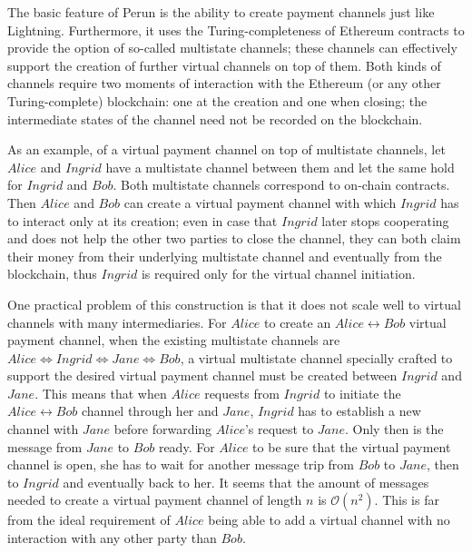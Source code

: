 The basic feature of Perun is the ability to create payment channels just like
Lightning. Furthermore, it uses the Turing-completeness of Ethereum contracts to provide
the option of so-called multistate channels; these channels can effectively support the
creation of further virtual channels on top of them. Both kinds of channels require two
moments of interaction with the Ethereum (or any other Turing-complete) blockchain: one
at the creation and one when closing; the intermediate states of the channel need not be
recorded on the blockchain.

As an example, of a virtual payment channel on top of multistate channels, let $Alice$
and $Ingrid$ have a multistate channel between them and let the same hold for $Ingrid$
and $Bob$. Both multistate channels correspond to on-chain contracts. Then $Alice$ and
$Bob$ can create a virtual payment channel with which $Ingrid$ has to interact only at
its creation; even in case that $Ingrid$ later stops cooperating and does not help the
other two parties to close the channel, they can both claim their money from their
underlying multistate channel and eventually from the blockchain, thus $Ingrid$ is
required only for the virtual channel initiation.

One practical problem of this construction is that it does not scale well to virtual
channels with many intermediaries. For $Alice$ to create an $Alice \leftrightarrow Bob$
virtual payment channel, when the existing multistate channels are $Alice
\Leftrightarrow Ingrid \Leftrightarrow Jane \Leftrightarrow Bob$, a virtual multistate
channel specially crafted to support the desired virtual payment channel must be created
between $Ingrid$ and $Jane$. This means that when $Alice$ requests from $Ingrid$ to
initiate the $Alice \leftrightarrow Bob$ channel through her and $Jane$, $Ingrid$ has to
establish a new channel with $Jane$ before forwarding $Alice$'s request to $Jane$. Only
then is the message from $Jane$ to $Bob$ ready. For $Alice$ to be sure that the virtual
payment channel is open, she has to wait for another message trip from $Bob$ to $Jane$,
then to $Ingrid$ and eventually back to her. It seems that the amount of messages needed
to create a virtual payment channel of length $n$ is $\mathcal{O}\left(n^2\right)$. This
is far from the ideal requirement of $Alice$ being able to add a virtual channel with no
interaction with any other party than $Bob$.

